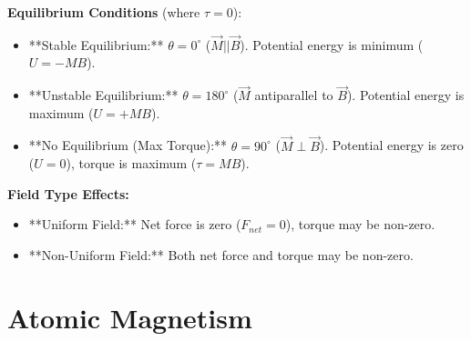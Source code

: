 \begin{frame}[t]
    \item<+-> \textbf{Equilibrium Conditions} (where $\tau = 0$):
        \begin{itemize}[<+->]
            \item **Stable Equilibrium:** $\theta = 0^\circ$ ($\vec{M} || \vec{B}$).   Potential energy is minimum ($U = -MB$).
            \item **Unstable Equilibrium:** $\theta = 180^\circ$ ($\vec{M}$ antiparallel to $\vec{B}$).   Potential energy is maximum ($U = +MB$).
            \item **No Equilibrium (Max Torque):** $\theta = 90^\circ$ ($\vec{M} \perp \vec{B}$).   Potential energy is zero ($U = 0$), torque is maximum ($\tau = MB$).
        \end{itemize}

    \item<+-> \textbf{Field Type Effects:}
        \begin{itemize}[<+->]
              \item **Uniform Field:** Net force is zero ($F_{net}=0$), torque may be non-zero.
              \item **Non-Uniform Field:** Both net force and torque may be non-zero.
        \end{itemize}
\end{frame}

\section{Atomic Magnetism}

\transfade[duration=0.5]


